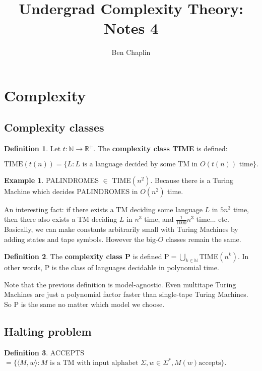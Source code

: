 \documentclass[11pt]{article}
\title{Undergrad Complexity Theory: Notes 4}
\author{Ben Chaplin}
\date{}
\theoremstyle{plain}
\theoremstyle{definition}
\newtheorem*{defn}{Definition}
\newtheorem*{ex}{Example}
\newcommand{\R}{\mathbb{R}}
\newcommand{\N}{\mathbb{N}}
\begin{document}
\maketitle
\tableofcontents

\section{Complexity}
\subsection{Complexity classes}

\begin{defn}
    Let $t: \N \rightarrow \R^+$. The {\bf complexity class TIME} is defined:
\end{defn}
$$\text{TIME}(t(n)) = \{L : L \text{ is a language decided by some TM in } O(t(n)) \text{ time}\}.$$

\begin{ex}
    PALINDROMES $ \in $ TIME$(n^2)$. Because there is a Turing Machine which decides PALINDROMES in $O(n^2)$ time.
\end{ex}

An interesting fact: if there exists a TM deciding some language $L$ in $5n^3$ time, then there also exists a TM
deciding $L$ in $n^3$ time, and $\frac{1}{1000} n^3$ time... etc. Basically, we can make constants arbitrarily small with
Turing Machines by adding states and tape symbols. However the big-$O$ classes remain the same.

\begin{defn}
    The {\bf complexity class P} is defined P$ = \bigcup_{k \in \N} $TIME$(n^k)$. In other words, P is the class of 
    languages decidable in polynomial time.
\end{defn}

Note that the previous definition is model-agnostic. Even multitape Turing Machines are just a polynomial factor faster
than single-tape Turing Machines. So P is the same no matter which model we choose.

\subsection{Halting problem}

\begin{defn}
    ACCEPTS $= \{\langle M, w \rangle : M \text{ is a TM with input alphabet } \Sigma, w \in \Sigma^*, M(w) \text{accepts}\}$.
\end{defn}
\end{document}
